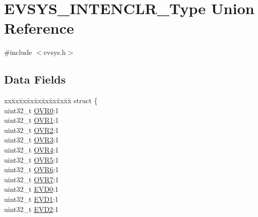 \hypertarget{union_e_v_s_y_s___i_n_t_e_n_c_l_r___type}{}\section{E\+V\+S\+Y\+S\+\_\+\+I\+N\+T\+E\+N\+C\+L\+R\+\_\+\+Type Union Reference}
\label{union_e_v_s_y_s___i_n_t_e_n_c_l_r___type}


{\ttfamily \#include $<$evsys.\+h$>$}

\subsection*{Data Fields}
\begin{DoxyCompactItemize}
\item 
\begin{tabbing}
xx\=xx\=xx\=xx\=xx\=xx\=xx\=xx\=xx\=\kill
struct \{\\
\>uint32\_t \mbox{\hyperlink{union_e_v_s_y_s___i_n_t_e_n_c_l_r___type_a68765deb259eed50fabcdf3d67161d9c}{OVR0}}:1\\
\>uint32\_t \mbox{\hyperlink{union_e_v_s_y_s___i_n_t_e_n_c_l_r___type_ab4500fbc729eb68af1169834db644496}{OVR1}}:1\\
\>uint32\_t \mbox{\hyperlink{union_e_v_s_y_s___i_n_t_e_n_c_l_r___type_a19ff2de00d937f7828dbac942854e02b}{OVR2}}:1\\
\>uint32\_t \mbox{\hyperlink{union_e_v_s_y_s___i_n_t_e_n_c_l_r___type_a7547a1999ed5ace810cbc6e6de3cfc31}{OVR3}}:1\\
\>uint32\_t \mbox{\hyperlink{union_e_v_s_y_s___i_n_t_e_n_c_l_r___type_a9505772fbd48ac14d080d014e378f12c}{OVR4}}:1\\
\>uint32\_t \mbox{\hyperlink{union_e_v_s_y_s___i_n_t_e_n_c_l_r___type_a53d9ffb7d90de59a4243113fdc1af972}{OVR5}}:1\\
\>uint32\_t \mbox{\hyperlink{union_e_v_s_y_s___i_n_t_e_n_c_l_r___type_a88825bfc918383b1cd4478c6018dc1b1}{OVR6}}:1\\
\>uint32\_t \mbox{\hyperlink{union_e_v_s_y_s___i_n_t_e_n_c_l_r___type_ac5c0adbfa6907f46b42a8509a20eb00d}{OVR7}}:1\\
\>uint32\_t \mbox{\hyperlink{union_e_v_s_y_s___i_n_t_e_n_c_l_r___type_a0e344ebebb2c4bdbb78b3ad34ca5b30f}{EVD0}}:1\\
\>uint32\_t \mbox{\hyperlink{union_e_v_s_y_s___i_n_t_e_n_c_l_r___type_ae20170496579de36130485d6500b5b73}{EVD1}}:1\\
\>uint32\_t \mbox{\hyperlink{union_e_v_s_y_s___i_n_t_e_n_c_l_r___type_a2a1e9817b34931b63082efaa98baa640}{EVD2}}:1\\

\end{tabbing}
\end{DoxyCompactItemize}

